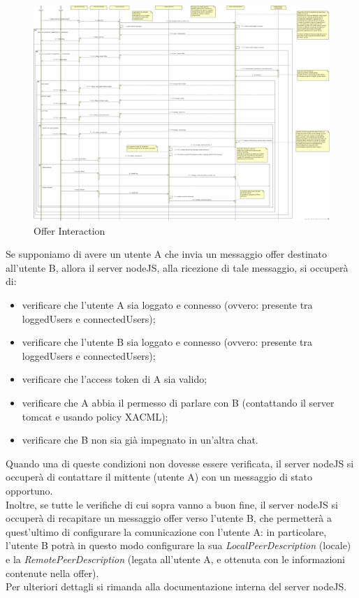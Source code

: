 \begin{landscape}
\begin{center}
\begin{figure}[!htbp]
	\centering
	\includegraphics[scale = .25]{img/sequence_offer.png}
	\caption{Offer Interaction}
	\label{gfx:offerinteraction}
\end{figure}
\end{center}	
\end{landscape}%
Se supponiamo di avere un utente A che invia un messaggio offer destinato all'utente B, allora il server nodeJS, alla ricezione di tale messaggio, si occuperà di:
\begin{itemize}
\item verificare che l'utente A sia loggato e connesso (ovvero: presente tra loggedUsers e connectedUsers);
\item verificare che l'utente B sia loggato e connesso (ovvero: presente tra loggedUsers e connectedUsers);
\item verificare che l'access token di A sia valido;
\item verificare che A abbia il permesso di parlare con B (contattando il server tomcat e usando policy XACML);
\item verificare che B non sia già impegnato in un'altra chat.
\end{itemize}

Quando una di queste condizioni non dovesse essere verificata, il server nodeJS si occuperà di contattare il mittente (utente A) con un messaggio di stato opportuno.\\
Inoltre, se tutte le verifiche di cui sopra vanno a buon fine, il server nodeJS si occuperà di recapitare un messaggio offer verso l'utente B, che permetterà a quest'ultimo di configurare la comunicazione con l'utente A: in particolare, l'utente B potrà in questo modo configurare la sua \textit{LocalPeerDescription} (locale) e la \textit{RemotePeerDescription} (legata all'utente A, e ottenuta con le informazioni contenute nella offer).\\
Per ulteriori dettagli si rimanda alla documentazione interna del server nodeJS.\\


